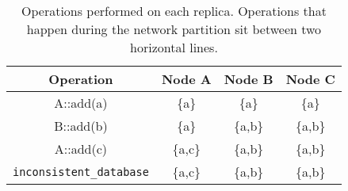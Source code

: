 \begin{table}[htp]
  \begin{tabular}{cccc}
    \toprule
    Operation & Node A & Node B & Node C \\
    \midrule
    A::add(a) & \{a\} & \{a\} & \{a\} \\
    \cmidrule{2-4}
    B::add(b) & \{a\} & \{a,b\} & \{a,b\} \\
    A::add(c) & \{a,c\} & \{a,b\} & \{a,b\} \\
    \cmidrule{2-4}
    \texttt{inconsistent\_database} & \{a,c\} & \{a,b\} & \{a,b\} \\
    \bottomrule
  \end{tabular} 
  \caption{Operations performed on each replica. Operations that happen during
  the network partition sit between two horizontal lines.}
  \label{tab:mnesia comm failure ops}
\end{table}

